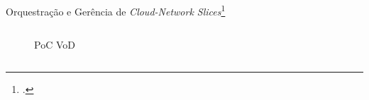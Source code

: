 \begin{frame}{Orquestração e Gerência de \textit{Cloud-Network Slices}\footcite{Rocha2022}}
    \begin{columns}
        \begin{column}{0.5\linewidth}
            \begin{figure}
                \centering
                \quad
                \caption{PoC VoD}
            \end{figure}            
        \end{column}
        \begin{column}{0.5\linewidth}
            \begin{figure}
                \centering
                \quad

\end{figure}
\end{column}
\end{columns}
\end{frame}
